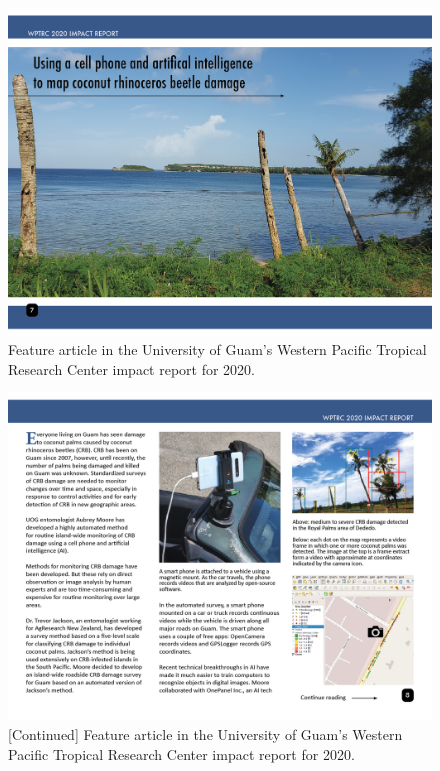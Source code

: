 \documentclass[12pt,letterpaper,english,bibliography=totocnumbered,abstract=on]{scrartcl}
\begin{document}
\begin{figure}[h]
	\centering
	\includegraphics[width=1\linewidth]{images/impact-report07.png}
	\caption{Feature article in the University of Guam's Western Pacific Tropical Research Center impact report for 2020.}
	\label{fig:roadside1-1}
\end{figure}

\begin{figure}[h]
	\centering
	\includegraphics[width=1\linewidth]{images/impact-report08.png}
	\caption{[Continued] Feature article in the University of Guam's Western Pacific Tropical Research Center impact report for 2020.}
	\label{fig:roadside1-2}
\end{figure}
\end{document}
